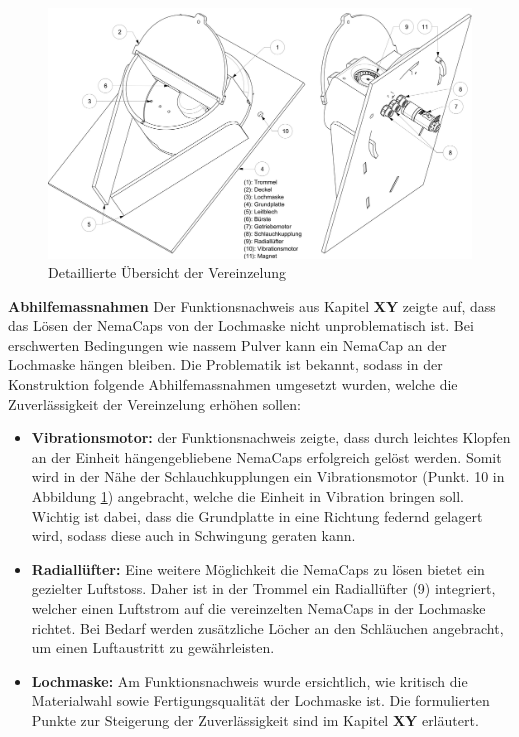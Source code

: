 	\begin{figure}[H]
	\includegraphics[scale=0.45]{Illustrationen/6-Umsetzung/details_vereinzelung.jpg}
	\caption{Detaillierte Übersicht der Vereinzelung}
	\label{fig:details_vereinzelung}
	\end{figure}
\textbf{Abhilfemassnahmen}
\newline
Der Funktionsnachweis aus Kapitel \textbf{XY} zeigte auf, dass das Lösen der NemaCaps von der Lochmaske nicht unproblematisch ist. Bei erschwerten Bedingungen wie nassem Pulver kann ein NemaCap an der Lochmaske hängen bleiben. Die Problematik ist bekannt, sodass in der Konstruktion folgende Abhilfemassnahmen umgesetzt wurden, welche die Zuverlässigkeit der Vereinzelung erhöhen sollen:
\begin{itemize}
	\item \textbf{Vibrationsmotor:} der Funktionsnachweis zeigte, dass durch leichtes Klopfen an der Einheit hängengebliebene NemaCaps erfolgreich gelöst werden. Somit wird in der Nähe der Schlauchkupplungen ein Vibrationsmotor (Punkt. 10 in Abbildung \ref{fig:details_vereinzelung}) angebracht, welche die Einheit in Vibration bringen soll. Wichtig ist dabei, dass die Grundplatte in eine Richtung federnd gelagert wird, sodass diese auch in Schwingung geraten kann.
	
	\item \textbf{Radiallüfter:} Eine weitere Möglichkeit die NemaCaps zu lösen bietet ein gezielter Luftstoss. Daher ist in der Trommel ein Radiallüfter (9) integriert, welcher einen Luftstrom auf die vereinzelten NemaCaps in der Lochmaske richtet. Bei Bedarf werden zusätzliche Löcher an den Schläuchen angebracht, um einen Luftaustritt zu gewährleisten. 
	
	\item \textbf{Lochmaske:} Am Funktionsnachweis wurde ersichtlich, wie kritisch die Materialwahl sowie Fertigungsqualität der Lochmaske ist. Die formulierten Punkte zur Steigerung der Zuverlässigkeit sind im Kapitel \textbf{XY} erläutert.
\end{itemize}

